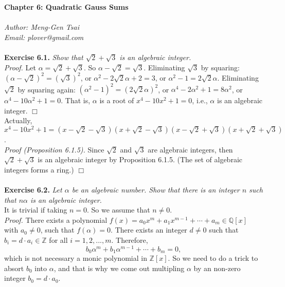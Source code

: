 \documentclass{article}
\begin{document}
\textbf{\Large Chapter 6: Quadratic Gauss Sums} \\\\



\emph{Author: Meng-Gen Tsai} \\
\emph{Email: plover@gmail.com} \\\\



\textbf{Exercise 6.1.}
\emph{Show that $\sqrt{2} + \sqrt{3}$ is an algebraic integer.} \\

\emph{Proof.}
Let $\alpha = \sqrt{2} + \sqrt{3}$. So $\alpha - \sqrt{2} = \sqrt{3}$.
Eliminating $\sqrt{3}$ by squaring:
$(\alpha - \sqrt{2})^2 = (\sqrt{3})^2$, or
$\alpha^2 - 2\sqrt{2}\alpha + 2 = 3$, or
$\alpha^2 - 1 = 2\sqrt{2}\alpha$.
Eliminating $\sqrt{2}$ by squaring again:
$(\alpha^2 - 1)^2 = (2\sqrt{2}\alpha)^2$, or
$\alpha^4 - 2 \alpha^2 + 1 = 8 \alpha^2$, or
$\alpha^4 - 10 \alpha^2 + 1 = 0$.
That is, $\alpha$ is a root of $x^4 - 10x^2 + 1 = 0$, i.e.,
$\alpha$ is an algebraic integer.
$\Box$ \\

Actually,
$x^4 - 10x^2 + 1 =
(x - \sqrt{2} - \sqrt{3})(x + \sqrt{2} - \sqrt{3})
(x - \sqrt{2} + \sqrt{3})(x + \sqrt{2} + \sqrt{3})$. \\

\emph{Proof (Proposition 6.1.5).}
Since $\sqrt{2}$ and $\sqrt{3}$ are algebraic integers,
then $\sqrt{2} + \sqrt{3}$ is an algebraic integer by Proposition 6.1.5.
(The set of algebraic integers forms a ring.)
$\Box$ \\\\



\textbf{Exercise 6.2.}
\emph{Let $\alpha$ be an algebraic number.
Show that there is an integer $n$ such that $n\alpha$ is an algebraic integer.} \\

It is trivial if taking $n = 0$. So we assume that $n \neq 0$. \\

\emph{Proof.}
There exists a polynomial
$f(x) = a_0 x^m + a_1 x^{m-1} + \cdots + a_m \in \mathbb{Q}[x]$ with $a_0 \neq 0$,
such that $f(\alpha) = 0$.
There exists an integer $d \neq 0$ such that
$b_i = d \cdot a_i \in \mathbb{Z}$ for all $i = 1, 2, ..., m$.
Therefore,
$$b_0 \alpha^m + b_1 \alpha^{m-1} + \cdots + b_m = 0,$$
which is not necessary a monic polynomial in $\mathbb{Z}[x]$.
So we need to do a trick to absort $b_0$ into $\alpha$,
and that is why we come out multipling $\alpha$ by an non-zero integer
$b_0 = d \cdot a_0$. \\
\end{document}
